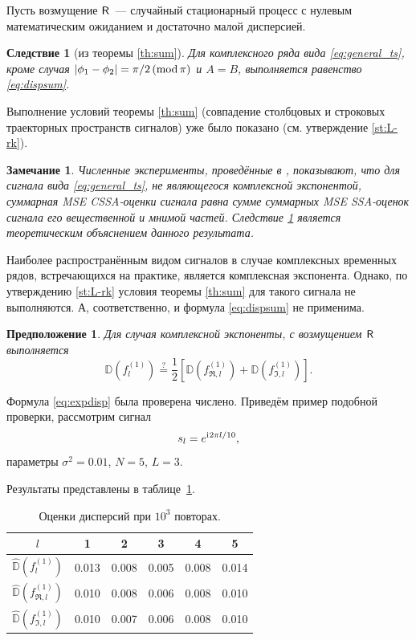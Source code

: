 \documentclass[specialist,
               substylefile = spbu.rtx,
               subf,href,colorlinks=true, 12pt]{disser}
\newtheorem{remark}{Замечание}
\newtheorem{corollary}{Следствие}
\newtheorem*{prop*}{Предположение}
\begin{document}
Пусть возмущение $\textsf{R}$~--- случайный стационарный процесс с нулевым математическим ожиданием и достаточно малой дисперсией.

\begin{corollary}[из теоремы {\ref{th:sum}}] \label{cor:harm}
	Для комплексного ряда вида \eqref{eq:general_ts}, кроме случая $|\phi_1-\phi_2| = \pi/2\,(\mathop{\mathrm{mod}} \pi)$ и $A=B$,  выполняется равенство \eqref{eq:dispsum}.
\end{corollary}
Выполнение условий теоремы {\ref{th:sum}} (совпадение столбцовых и строковых траекторных пространств сигналов) уже было показано (см. утверждение \ref{st:L-rk}).

\begin{remark}
	Численные эксперименты, проведённые в \cite{Golyandina.etal2013}, показывают, что для сигнала вида \eqref{eq:general_ts}, не являющегося комплексной экспонентой, суммарная MSE CSSA-оценки сигнала равна сумме суммарных MSE SSA-оценок сигнала его вещественной и мнимой частей. Следствие \ref{cor:harm} является теоретическим объяснением данного результата.
\end{remark}

Наиболее распространённым видом сигналов в случае комплексных временных рядов, встречающихся на практике, является комплексная экспонента. Однако, по утверждению \ref{st:L-rk} условия теоремы \ref{th:sum} для такого сигнала не выполняются. А, соответственно, и формула \eqref{eq:dispsum} не применима.

\begin{prop*}
	Для случая комплексной экспоненты, с возмущением $\textsf{R}$ выполняется
	\begin{equation} \label{eq:expdisp}
		\mathbb{D}(f^{(1)}_l) \stackrel{?}{=} \frac{1}{2}[\mathbb{D}(f^{(1)}_{\Re, l}) + \mathbb{D}(f^{(1)}_{\Im, l})].
	\end{equation}
\end{prop*}

Формула \eqref{eq:expdisp} была проверена числено. Приведём пример подобной проверки, рассмотрим сигнал
$$s_l = e^{\mathrm{i}\mkern1mu 2 \pi l / 10},$$
параметры $\sigma^2 = 0.01$, $N = 5$, $L = 3$.

Результаты представлены в таблице~\ref{tab:pi_div_2}.

\begin{table}[H]
	\begin{center}
		\caption{Оценки дисперсий при $10^3$ повторах.}
		\label{tab:pi_div_2}
		\begin{tabular}{|c|c|c|c|c|c|}
			\hline
			$l$	& 1 & 2 & 3 & 4 & 5\\
			\hline
			$\hat{\mathbb{D}}(f^{(1)}_l)$ & 0.013  & 0.008  & 0.005 & 0.008 & 0.014\\
			\hline
			$\hat{\mathbb{D}}(f^{(1)}_{\Re, l})$ & 0.010 & 0.008 & 0.006 & 0.008 & 0.010\\
			\hline
			$\hat{\mathbb{D}}(f^{(1)}_{\Im, l})$ & 0.010  & 0.007  & 0.006 & 0.008 & 0.010\\
			\hline
		\end{tabular}
	\end{center}
\end{table}
\end{document}
